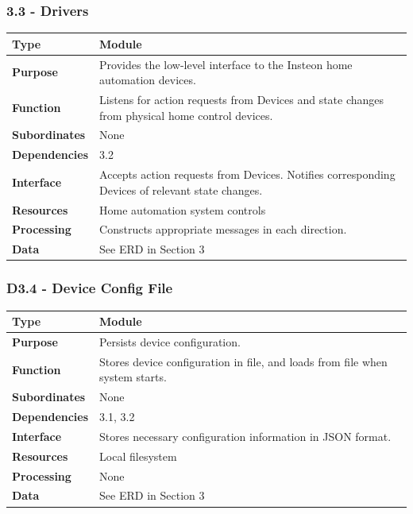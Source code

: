\documentclass{article}
\begin{document}
\subsubsection*{3.3 - Drivers}
\begin{tabular}{ | l |  p{13.3cm} |}
\hline
\textbf{Type} & Module \\ \hline
\textbf{Purpose} & Provides the low-level interface to the Insteon home
automation devices. \\ \hline
\textbf{Function} & Listens for action requests from Devices and state changes
from physical home control devices. \\ \hline
\textbf{Subordinates} & None \\ \hline
\textbf{Dependencies} & 3.2 \\ \hline
\textbf{Interface} & Accepts action requests from Devices. Notifies
corresponding Devices of relevant state changes. \\ \hline
\textbf{Resources} & Home automation system controls \\ \hline
\textbf{Processing} & Constructs appropriate messages in each direction. \\ \hline
\textbf{Data} & See ERD in Section 3 \\ \hline
\end{tabular}

\subsubsection*{D3.4 - Device Config File}
\begin{tabular}{ | l |  p{13.3cm} |}
\hline
\textbf{Type} & Module \\ \hline
\textbf{Purpose} & Persists device configuration. \\ \hline
\textbf{Function} & Stores device configuration in file, and loads from file
when system starts. \\ \hline
\textbf{Subordinates} & None \\ \hline
\textbf{Dependencies} & 3.1, 3.2 \\ \hline
\textbf{Interface} & Stores necessary configuration information in JSON
format. \\ \hline
\textbf{Resources} & Local filesystem \\ \hline
\textbf{Processing} & None \\ \hline
\textbf{Data} & See ERD in Section 3 \\ \hline
\end{tabular}
\end{document}
